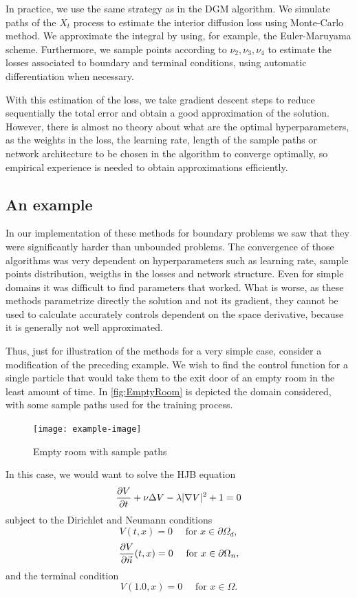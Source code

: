 In practice, we use the same strategy as in the DGM algorithm. We simulate paths  of the $X_t$ process to estimate the interior diffusion loss using Monte-Carlo method. We approximate the integral by using, for example, the Euler-Maruyama scheme. Furthermore, we sample points according to $\nu_2,\nu_3,\nu_4$ to estimate the losses associated to boundary and terminal conditions, using automatic differentiation when necessary. 

With this estimation of the loss, we take gradient descent steps to reduce sequentially the total error and obtain a good approximation of the solution. However, there is almost no theory about what are the optimal hyperparameters, as the weights in the loss, the learning rate, length of the sample paths or network architecture to be chosen in the algorithm to converge optimally, so empirical experience is needed to obtain approximations efficiently.


\subsection{An example}
In our implementation of these methods for boundary problems we saw that they were significantly harder than unbounded problems. The convergence of those algorithms was very dependent on hyperparameters such as learning rate, sample points distribution, weigths in the losses and network structure. Even for simple domains it was difficult to find parameters that worked. What is worse, as these methods parametrize directly the solution and not its gradient, they cannot be used to calculate accurately controls dependent on the space derivative, because it is generally not well approximated.   

Thus, just for illustration of the methods for a very simple case, consider a modification of the preceding example. We wish to find the control function for a single particle that would take them to the exit door of an empty room in the least amount of time. In \autoref{fig:EmptyRoom} is depicted the domain considered, with some sample paths used for the training process.

\begin{figure}[H]
	\centering
	\texttt{[image: example-image]}
	\caption{Empty room with sample paths}
	\label{fig:EmptyRoom}
\end{figure}

In this case, we would want to solve the HJB equation
\begin{equation}
	\label{eqn:HJB2D}
	\frac{\partial V}{\partial t}+\nu \Delta V -\lambda |\nabla V|^2+1=0
\end{equation} 
subject to the Dirichlet and Neumann conditions
\begin{equation}
	V(t,x)=0 \quad \text{ for } x\in \partial\Omega_d, 
\end{equation}
\begin{equation}
	\frac{\partial V}{\partial \vec{n}}(t,x)=0 \quad \text{ for } x\in \partial\Omega_n, 
\end{equation}
and the terminal condition
\begin{equation}
	V(1.0,x)=0 \quad \text{ for } x\in \Omega.
\end{equation}

